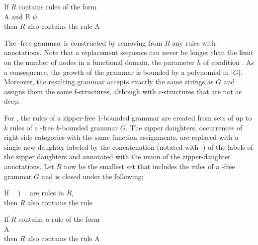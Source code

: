 \documentclass[output=paper,hidelinks]{langscibook}
\begin{document}
\ea\label{trivR}
If $R$ contains rules of the form\\
\hsp{2em} A \rarrow {}
                       \hsp{.75em}and\hsp{.75em}
                 B \rarrow $\psi$\\
then $R$ also contains the rule A \rarrow \mb{\delta\ \rcat{$\psi$\\[-1ex]$\alpha$}\hsp{-.3em}\theta}
\z

\noindent The \trivial-free grammar \Gminus is constructed by removing from $R$ any rules with \trivial annotations. Note that a replacement sequence can never be longer than the limit on the number of nodes in a functional domain, the parameter $h$ of condition .  As a consequence, the growth of the grammar is bounded by a polynomial in $|G|$. Moreover, the resulting grammar \Gminus accepts exactly the same strings as $G$ and assigns them the same f-structures, although with c-structures that are not as deep.

For , the rules of a zipper-free 1-bounded grammar are created from sets of up to $k$ rules of a \trivial-free $k$-bounded grammar $G$. The zipper daughters, occurrences of right-side categories with the same function assignments, are replaced with a single new daughter labeled by the concatenation (notated with $\cdot$) of the labels of the zipper daughters and annotated with the union of the zipper-daughter annotations. Let $R$ now be the smallest set that includes the rules of a \trivial-free grammar $G$ and is closed under the following:


\ea\label{zipR}
\ea\label{zipRk} If   \ \    ) \ \ are rules in $R$,\\[1ex]
 \hsp{1em}then $R$ also contains the rule \vspace{1ex}
 
\ex\label{zipR1}  If $R$ contains a rule of the form\\
\hsp{2em}  A \rarrow  {}\\
\hsp{1em}then $R$ also contains the rule
                  A \rarrow  {}
\z \z
\end{document}
